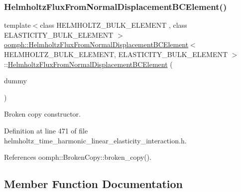 \subsubsection{\texorpdfstring{Helmholtz\+Flux\+From\+Normal\+Displacement\+B\+C\+Element()}{HelmholtzFluxFromNormalDisplacementBCElement()}\hspace{0.1cm}{\footnotesize\ttfamily [2/2]}}
{\footnotesize\ttfamily template$<$class H\+E\+L\+M\+H\+O\+L\+T\+Z\+\_\+\+B\+U\+L\+K\+\_\+\+E\+L\+E\+M\+E\+NT , class E\+L\+A\+S\+T\+I\+C\+I\+T\+Y\+\_\+\+B\+U\+L\+K\+\_\+\+E\+L\+E\+M\+E\+NT $>$ \\
\hyperlink{classoomph_1_1HelmholtzFluxFromNormalDisplacementBCElement}{oomph\+::\+Helmholtz\+Flux\+From\+Normal\+Displacement\+B\+C\+Element}$<$ H\+E\+L\+M\+H\+O\+L\+T\+Z\+\_\+\+B\+U\+L\+K\+\_\+\+E\+L\+E\+M\+E\+NT, E\+L\+A\+S\+T\+I\+C\+I\+T\+Y\+\_\+\+B\+U\+L\+K\+\_\+\+E\+L\+E\+M\+E\+NT $>$\+::\hyperlink{classoomph_1_1HelmholtzFluxFromNormalDisplacementBCElement}{Helmholtz\+Flux\+From\+Normal\+Displacement\+B\+C\+Element} (\begin{DoxyParamCaption}\item[{const \hyperlink{classoomph_1_1HelmholtzFluxFromNormalDisplacementBCElement}{Helmholtz\+Flux\+From\+Normal\+Displacement\+B\+C\+Element}$<$ H\+E\+L\+M\+H\+O\+L\+T\+Z\+\_\+\+B\+U\+L\+K\+\_\+\+E\+L\+E\+M\+E\+NT, E\+L\+A\+S\+T\+I\+C\+I\+T\+Y\+\_\+\+B\+U\+L\+K\+\_\+\+E\+L\+E\+M\+E\+NT $>$ \&}]{dummy }\end{DoxyParamCaption})\hspace{0.3cm}{\ttfamily [inline]}}



Broken copy constructor. 



Definition at line 471 of file helmholtz\+\_\+time\+\_\+harmonic\+\_\+linear\+\_\+elasticity\+\_\+interaction.\+h.



References oomph\+::\+Broken\+Copy\+::broken\+\_\+copy().



\subsection{Member Function Documentation}
\mbox{\label{classoomph_1_1HelmholtzFluxFromNormalDisplacementBCElement_a5e10f6e632c05ce464548f51c8381b43}} 
